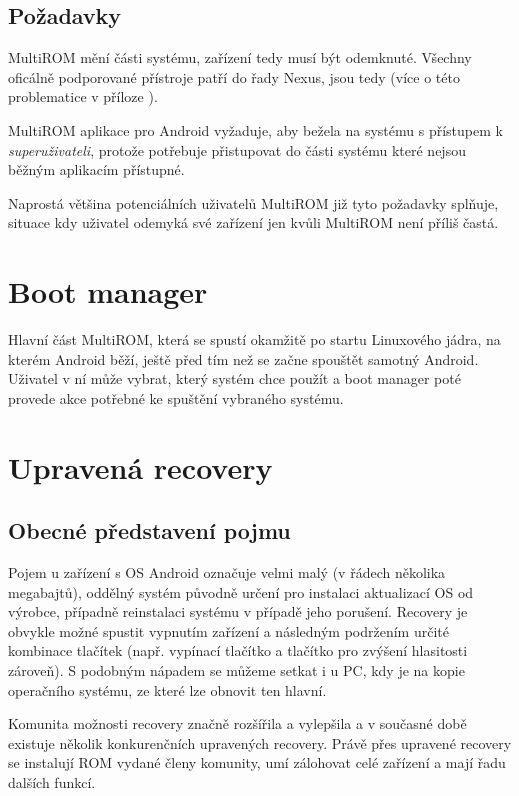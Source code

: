 \documentclass[12pt, a4paper, oneside]{article}
\newcommand{\It}{\textit}  %
\begin{document}
\subsection{Požadavky}
MultiROM mění části systému, zařízení tedy musí být odemknuté. Všechny oficálně podporované přístroje patří do řady Nexus, jsou tedy  (více o této problematice v příloze ).

MultiROM aplikace pro Android vyžaduje, aby bežela na systému s přístupem k \It{superuživateli}, protože potřebuje přistupovat do části systému které nejsou běžným aplikacím přístupné.

Naprostá většina potenciálních uživatelů MultiROM již tyto požadavky splňuje, situace kdy uživatel odemyká své zařízení jen kvůli MultiROM není příliš častá.


\section{Boot manager}
Hlavní část MultiROM, která se spustí okamžitě po startu Linuxového jádra, na kterém Android běží, ještě před tím než se začne spouštět samotný Android. Uživatel v ní může vybrat, který systém chce použít a boot manager poté provede akce potřebné ke spuštění vybraného systému.


\section{Upravená recovery}
\subsection{Obecné představení pojmu}
Pojem  u zařízení s OS Android označuje velmi malý (v řádech několika megabajtů), oddělný systém původně určení pro instalaci aktualizací OS od výrobce, případně reinstalaci systému v případě jeho porušení. Recovery je obvykle možné spustit vypnutím zařízení a následným podržením určité kombinace tlačítek (např. vypínací tlačítko a tlačítko pro zvýšení hlasitosti zároveň). S podobným nápadem se můžeme setkat i u PC, kdy je na  kopie operačního systému, ze které lze obnovit ten hlavní.

Komunita možnosti recovery značně rozšířila a vylepšila a v současné době existuje několik konkurenčních upravených recovery. Právě přes upravené recovery se instalují ROM vydané členy komunity, umí zálohovat celé zařízení a mají řadu dalších funkcí.
\end{document}
